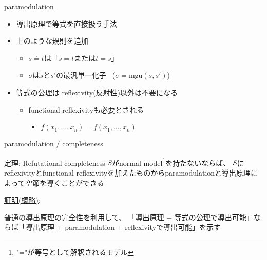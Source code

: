 \documentclass[dvipdfmx,11pt,notheorems]{beamer}
\theoremstyle{definition}
\newcommand{\blue}[1]{{\color{blue} #1}}
\begin{document}
\begin{frame}{paramodulation}

  {\Large
  \begin{prooftree}
  \end{prooftree}
  }
  \begin{itemize}
    \item 導出原理で等式を直接扱う手法
    \item 上のような規則を追加
    \begin{itemize}
      \item $s \doteq t$は「$s = t$または$t = s$」
      \item $\sigma$は$s$と$s'$の最汎単一化子 \, ($\sigma = \text{mgu}(s, s')$)
    \end{itemize}

    \item 等式の公理は\blue{reflexivity(反射性)以外は}不要になる
    \begin{itemize}
      \item functional reflexivityも必要とされる
      \begin{itemize}
        \item $f(x_1, \ldots, x_n) = f(x_1, \ldots, x_n)$
      \end{itemize}
    \end{itemize}
  \end{itemize}
\end{frame}

\begin{frame}{paramodulation / completeness}
\begin{block}{定理: Refutational completeness}
$S$がnormal model\footnote{"="が等号として解釈されるモデル}を持たないならば、
$S$にreflexivityとfunctional reflexivityを加えたものからparamodulationと導出原理によって空節を導くことができる
\end{block}

\underline{証明(概略)}:

\vspace{5pt}
普通の導出原理の完全性を利用して、
「導出原理 + 等式の公理で導出可能」ならば「導出原理 + paramodulation + reflexivityで導出可能」を示す
\end{frame}
\end{document}
